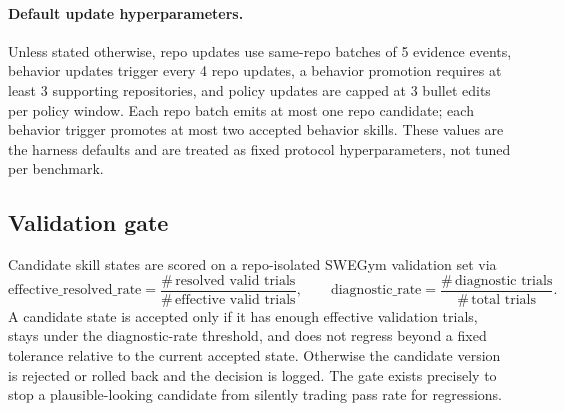 \paragraph{Default update hyperparameters.}
Unless stated otherwise, repo updates use same-repo batches of 5 evidence events,
behavior updates trigger every 4 repo updates, a behavior promotion
requires at least 3 supporting repositories, and policy updates are capped at 3
bullet edits per policy window. Each repo batch emits at most one repo candidate;
each behavior trigger promotes at most two accepted behavior skills.
These values are the harness defaults and are treated as fixed protocol
hyperparameters, not tuned per benchmark.

\subsection{Validation gate}

Candidate skill states are scored on a repo-isolated SWEGym validation set via
\[
\mathrm{effective\_resolved\_rate}
= \frac{\#\,\text{resolved valid trials}}{\#\,\text{effective valid trials}},
\qquad
\mathrm{diagnostic\_rate}
= \frac{\#\,\text{diagnostic trials}}{\#\,\text{total trials}}.
\]
A candidate state is accepted only if it has enough effective validation trials,
stays under the diagnostic-rate threshold, and does not regress beyond a fixed
tolerance relative to the current accepted state. Otherwise the candidate version
is rejected or rolled back and the decision is logged. The gate exists precisely
to stop a plausible-looking candidate from silently trading pass rate for
regressions.
